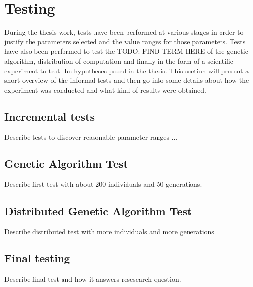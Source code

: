 \section{Testing}
\label{Testing}
During the thesis work, tests have been performed at various stages in order to justify the parameters selected and the value ranges for those parameters. Tests have also been performed to test the TODO: FIND TERM HERE of the genetic algorithm, distribution of computation and finally in the form of a scientific experiment to test the hypotheses posed in the thesis. This section will present a short overview of the informal tests and then go into some details about how the experiment was conducted and what kind of results were obtained. 

\subsection{Incremental tests}
Describe tests to discover reasonable parameter ranges ...

\subsection{Genetic Algorithm Test}
Describe first test with about 200 individuals and 50 generations.

\subsection{Distributed Genetic Algorithm Test}
Describe distributed test with more individuals and more generations

\subsection{Final testing}
Describe final test and how it answers resesearch question.